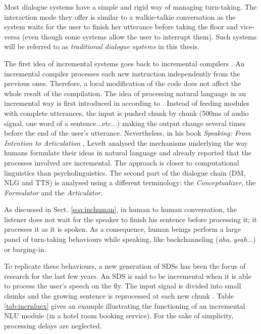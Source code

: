     Most dialogue systems have a simple and rigid way of managing turn-taking. The interaction mode they offer is similar to a walkie-talkie conversation as the system waits for the user to finish her utterance before taking the floor and vice-versa (even though some systems allow the user to interrupt them). Such systems will be referred to as \textit{traditional dialogue systems} in this thesis.
    
    The first idea of incremental systems goes back to incremental compilers \cite{Lock1965}. An incremental compiler processes each new instruction independently from the previous ones. Therefore, a local modification of the code does not affect the whole result of the compilation. The idea of processing natural language in an incremental way is first introduced in \cite{Wiren1992} according to \cite{Kilger1995}. Instead of feeding modules with complete utterances, the input is pushed chunk by chunk (500ms of audio signal, one word of a sentence...etc...) making the output change several times before the end of the user's utterance. Nevertheless, in his book \textit{Speaking: From Intention to Articulation} \cite{Levelt1989}, Levelt analysed the mechanisms underlying the way humans formulate their ideas in natural language and already reported that the processes involved are incremental. The approach is closer to computational linguistics than psycholinguistics. The second part of the dialogue chain (DM, NLG and TTS) is analysed using a different terminology: the \textit{Conceptualizer}, the \textit{Formulator} and the \textit{Articulator}.

    As discussed in Sect. \ref{soa:inchuman}, in human to human conversation, the listener does not wait for the speaker to finish his sentence before processing it; it processes it as it is spoken. As a consequence, human beings perform a large panel of turn-taking behaviours while speaking, like backchanneling (\textit{aha}, \textit{yeah}...) or barging-in.

    To replicate these behaviours, a new generation of SDSs has been the focus of research for the last few years. An SDS is said to be incremental when it is able to process the user's speech on the fly. The input signal is divided into small chunks and the growing sentence is reprocessed at each new chunk \cite{Schlangen2011}. Table \ref{tab:incrnluex} gives an example illustrating the functioning of an incremental NLU module (in a hotel room booking service). For the sake of simplicity, processing delays are neglected.

